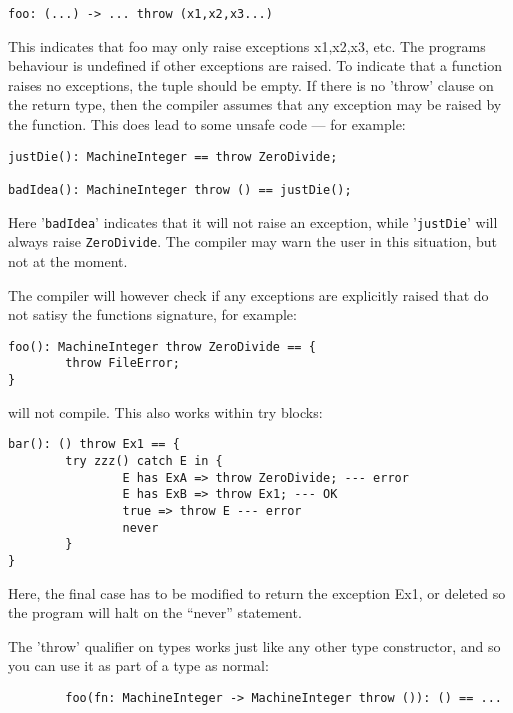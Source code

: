 \documentclass{article}
\begin{document}
\begin{center}
\begin{verbatim}
foo: (...) -> ... throw (x1,x2,x3...)
\end{verbatim}
\end{center}

This indicates that foo may only raise exceptions x1,x2,x3, etc.
The programs behaviour is undefined if other exceptions are
raised.  To indicate that a function raises no exceptions, the tuple
should be empty.  If there is no 'throw' clause on the return type,
then the compiler assumes that any exception may be raised by the
function.  This does lead to some unsafe code --- for example:

\begin{center}
\begin{verbatim}
justDie(): MachineInteger == throw ZeroDivide;

badIdea(): MachineInteger throw () == justDie();
\end{verbatim}
\end{center}

Here '{\tt badIdea}' indicates that it will not raise an exception,
while '{\tt justDie}' will always raise {\tt ZeroDivide}.  The compiler may
warn the user in this situation, but not at the moment.

The compiler will however check if any exceptions are explicitly
raised that do not satisy the functions signature, for example:
\begin{verbatim}
foo(): MachineInteger throw ZeroDivide == {
        throw FileError;
}
\end{verbatim}
will not compile.  This also works within try blocks:
\begin{verbatim}
bar(): () throw Ex1 == {
        try zzz() catch E in {
                E has ExA => throw ZeroDivide; --- error
                E has ExB => throw Ex1; --- OK
                true => throw E --- error
                never
        }
}
\end{verbatim}
Here, the final case has to be modified to return the exception
Ex1, or deleted so the program will halt on the ``never'' statement.

The 'throw' qualifier on types works just like any other type
constructor, and so you can use it as part of a type as normal:
\begin{verbatim}
        foo(fn: MachineInteger -> MachineInteger throw ()): () == ...
\end{verbatim}
\end{document}
